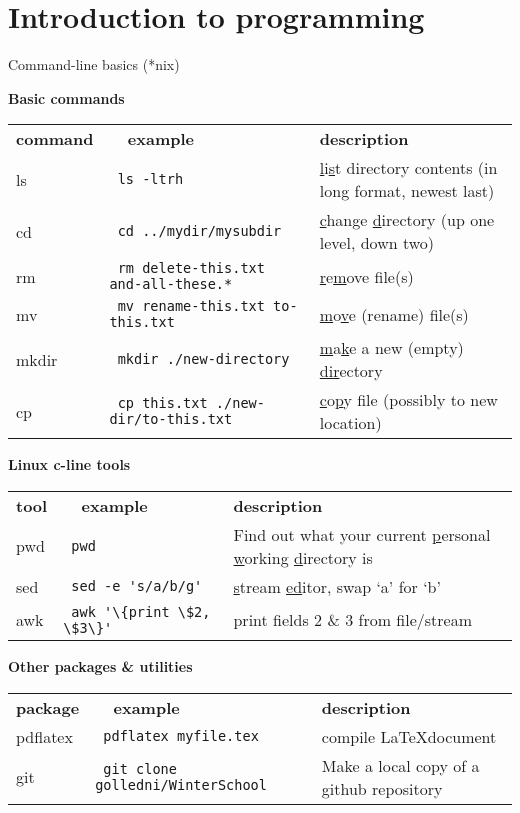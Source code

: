 

\section{Introduction to programming}
\begin{frame}{\insertsectionnumber{ |} Command-line basics (*nix)}

\hspace*{-0.5cm}\textbf{Basic commands} \\
\vspace*{0.25cm}\begin{tabular}{p{0.75cm} p{6cm} p{3.5cm}}
\textbf{command} & \textbf{~~example} & \textbf{description} \\
ls & \Verb+ ls -ltrh + & \ul{l}i\ul{s}t directory contents (in long format, newest last) \\
cd & \Verb+ cd ../mydir/mysubdir + & \ul{c}hange \ul{d}irectory (up one level, down two) \\
rm & \Verb+ rm delete-this.txt and-all-these.* + & \ul{r}e\ul{m}ove file(s) \\
mv & \Verb+ mv rename-this.txt to-this.txt + & \ul{m}o\ul{v}e (rename) file(s) \\
mkdir & \Verb+ mkdir ./new-directory + & \ul{m}a\ul{k}e a new (empty) \ul{dir}ectory  \\
cp & \Verb+ cp this.txt ./new-dir/to-this.txt + & \ul{c}o\ul{p}y file (possibly to new location) \\
\end{tabular}


\vspace*{0.5cm}\hspace*{-0.5cm}\textbf{Linux c-line tools} \\
\begin{tabular}{p{0.75cm} p{6cm} p{3.5cm}}
\textbf{tool} & \textbf{~~example} & \textbf{description} \\
pwd & \Verb+ pwd + & Find out what your current \ul{p}ersonal \ul{w}orking \ul{d}irectory is \\
sed & \Verb+ sed -e 's/a/b/g'+ & \ul{s}tream \ul{ed}itor, swap `a' for `b' \\
awk & \Verb+ awk '\{print \$2, \$3\}'+ & print fields 2 \& 3 from file/stream \\
\end{tabular}

\vspace*{0.5cm}\hspace*{-0.5cm}\textbf{Other packages \& utilities} \\
\begin{tabular}{p{0.75cm} p{6cm} p{3.5cm}}
\textbf{package} & \textbf{~~example} & \textbf{description} \\
pdflatex & \Verb+ pdflatex myfile.tex + & compile \LaTeX document \\
git & \Verb+ git clone golledni/WinterSchool + & Make a local copy of a github repository \\
\end{tabular}


\end{frame}

